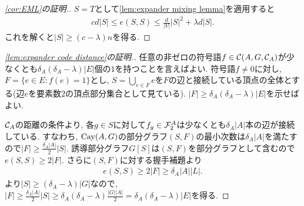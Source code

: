 \begin{proof}[\cref{cor:EML}の証明.]
    $S=T$として\cref{lem:expander mixing lemma}を適用すると
    \begin{align*}
        cd|S| \leq e(S,S) \leq \frac{d}{|V|}|S|^2+\lambda d |S|.
    \end{align*}
    これを解くと$|S|\geq (c-\lambda)n$を得る.
\end{proof}
%
\begin{proof}[\cref{lem:expander code distance}の証明.]
    任意の非ゼロの符号語$f\in\mathcal{C}(A,G,\mathcal{C}_A)$が少なくとも$\delta_A(\delta_A-\lambda)|E|$個の$1$を持つことを言えばよい.
    符号語$f\neq 0$に対し, $F=\{e\in E\colon f(e)=1\}$とし, $S=\bigcup_{e\in F}e$を$F$の辺と接続している頂点の全体とする(辺$e$を要素数$2$の頂点部分集合として見ている).
    $|F|\geq\delta_A(\delta_A-\lambda)|E|$を示せばよい.

    $\mathcal{C}_A$の距離の条件より,
    各$g\in S$に対して$f_g\in\mathcal{F}_2^A$は少なくとも$\delta_A|A|$本の辺が接続している.
    すなわち, $\mathrm{Cay}(A,G)$の部分グラフ$(S,F)$の最小次数は$\delta_A|A|$を満たすので$|F|\geq \frac{\delta_A |A|}{2}|S|$.
    誘導部分グラフ$G[S]$は$(S,F)$を部分グラフとして含むので$e(S,S)\geq 2|F|$.
    さらに$(S,F)$に対する握手補題より
    \begin{align*}
        e(S,S)\geq 2|F|\geq \delta_A|A||L|.
    \end{align*}
%
    より$|S|\geq (\delta_A-\lambda)|G|$なので,
    $|F|\geq \frac{\delta_A|A|}{2}|S|\geq \delta_A(\delta_A-\lambda)\frac{|G||A|}{2}=\delta_A(\delta_A-\lambda)|E|$を得る.
\end{proof}


